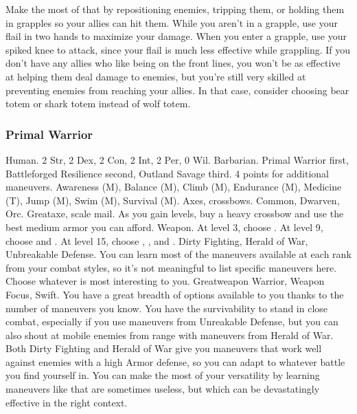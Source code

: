             Make the most of that by repositioning enemies, tripping them, or holding them in grapples so your allies can hit them.
            While you aren't in a grapple, use your flail in two hands to maximize your damage.
            When you enter a grapple, use your spiked knee to attack, since your flail is much less effective while grappling.
            If you don't have any allies who like being on the front lines, you won't be as effective at helping them deal damage to enemies, but you're still very skilled at preventing enemies from reaching your allies.
            In that case, consider choosing bear totem or shark totem instead of wolf totem.

        \subsubsection{Primal Warrior}
             Human.
             2 Str, 2 Dex, 2 Con, 2 Int, 2 Per, 0 Wil.
             Barbarian.
             Primal Warrior first, Battleforged Resilience second, Outland Savage third.
             4 points for additional maneuvers.
             Awareness (M), Balance (M), Climb (M), Endurance (M), Medicine (T), Jump (M), Swim (M), Survival (M).
             Axes, crossbows.
             Common, Dwarven, Orc.
             Greataxe, scale mail. As you gain levels, buy a heavy crossbow and use the best medium armor you can afford.
             Weapon.
                At level 3, choose .
                At level 9, choose  and .
                At level 15, choose , , and .
             Dirty Fighting, Herald of War, Unbreakable Defense.
             You can learn most of the maneuvers available at each rank from your combat styles, so it's not meaningful to list specific maneuvers here.
            Choose whatever is most interesting to you.
             Greatweapon Warrior, Weapon Focus, Swift.
             You have a great breadth of options available to you thanks to the number of maneuvers you know.
            You have the survivability to stand in close combat, especially if you use maneuvers from Unreakable Defense, but you can also shout at mobile enemies from range with maneuvers from Herald of War.
            Both Dirty Fighting and Herald of War give you maneuvers that work well against enemies with a high Armor defense, so you can adapt to whatever battle you find yourself in.
            You can make the most of your versatility by learning maneuvers like  that are sometimes useless, but which can be devastatingly effective in the right context.

